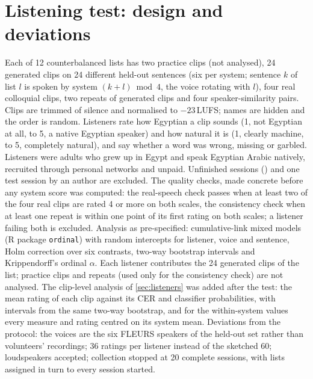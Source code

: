 \documentclass[11pt]{article}
\begin{document}
\section{Listening test: design and deviations}\label{app:listening}
Each of 12 counterbalanced lists has two practice clips (not analysed), 24 generated clips on 24 different held-out
sentences (six per system; sentence $k$ of list $l$ is spoken by system $(k+l) \bmod 4$, the voice rotating with $l$),
four real colloquial clips, two repeats of generated clips and four speaker-similarity pairs. Clips are trimmed of
silence and normalised to $-23$\,LUFS; names are hidden and the order is random. Listeners rate how Egyptian a clip sounds
(1, not Egyptian at all, to 5, a native Egyptian speaker) and how natural it is (1, clearly machine, to 5, completely
natural), and say whether a word was wrong, missing or garbled. Listeners were adults who grew up in Egypt and speak
Egyptian Arabic natively, recruited through personal networks and unpaid. Unfinished sessions () and one test
session by an author are excluded. The quality checks, made concrete before any system score was computed: the
real-speech check passes when at least two of the four real clips are rated 4 or more on both scales, the consistency
check when at least one repeat is within one point of its first rating on both scales; a listener failing both is
excluded. Analysis as pre-specified: cumulative-link mixed models (R package \texttt{ordinal}) with random intercepts for
listener, voice and sentence, Holm correction over six contrasts, two-way bootstrap intervals and Krippendorff's ordinal
$\alpha$. Each listener contributes the 24 generated clips of the list; practice clips and repeats (used only for the
consistency check) are not analysed. The clip-level analysis of \cref{sec:listeners} was added after the test: the mean
rating of each clip against its CER and classifier probabilities, with intervals from the same two-way bootstrap, and for
the within-system values every measure and rating centred on its system mean. Deviations from the protocol: the voices are the six FLEURS speakers of the held-out set rather than volunteers'
recordings; 36 ratings per listener instead of the sketched 60; loudspeakers accepted; collection stopped at 20 complete
sessions, with lists assigned in turn to every session started.
\end{document}
